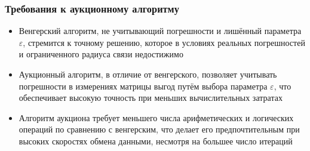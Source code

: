 \documentclass{beamer}
\begin{document}
	\begin{frame}
	    \frametitle{Требования к  аукционному алгоритму}
	    \small
	    \begin{itemize}
	        \item Венгерский алгоритм, не учитывающий погрешности и лишённый параметра  $\varepsilon$, стремится к точному решению, которое в условиях реальных погрешностей и ограниченного радиуса связи недостижимо
	        \item Аукционный алгоритм, в отличие от венгерского, позволяет учитывать погрешности в измерениях матрицы выгод путём выбора параметра $\varepsilon$, что обеспечивает высокую точность при меньших вычислительных затратах
	        \item Алгоритм аукциона требует меньшего числа арифметических и логических операций по сравнению с венгерским, что делает его предпочтительным при высоких скоростях обмена данными, несмотря на большее число итераций
	    \end{itemize}
	\end{frame}
	
\end{document}
